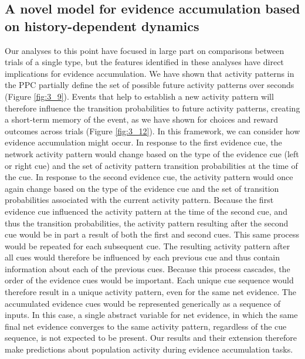 \subsection{A novel model for evidence accumulation based on history-dependent dynamics} \label{sec:chap3_ev_accum}

Our analyses to this point have focused in large part on comparisons between trials of a single type, but the features identified in these analyses have direct implications for evidence accumulation. We have shown that activity patterns in the PPC partially define the set of possible future activity patterns over seconds (Figure \ref{fig:3_9}). Events that help to establish a new activity pattern will therefore influence the transition probabilities to future activity patterns, creating a short-term memory of the event, as we have shown for choices and reward outcomes across trials (Figure \ref{fig:3_12}). In this framework, we can consider how evidence accumulation might occur. In response to the first evidence cue, the network activity pattern would change based on the type of the evidence cue (left or right cue) and the set of activity pattern transition probabilities at the time of the cue. In response to the second evidence cue, the activity pattern would once again change based on the type of the evidence cue and the set of transition probabilities associated with the current activity pattern. Because the first evidence cue influenced the activity pattern at the time of the second cue, and thus the transition probabilities, the activity pattern resulting after the second cue would be in part a result of both the first and second cues. This same process would be repeated for each subsequent cue. The resulting activity pattern after all cues would therefore be influenced by each previous cue and thus contain information about each of the previous cues. Because this process cascades, the order of the evidence cues would be important. Each unique cue sequence would therefore result in a unique activity pattern, even for the same net evidence. The accumulated evidence cues would be represented generically as a sequence of inputs. In this case, a single abstract variable for net evidence, in which the same final net evidence converges to the same activity pattern, regardless of the cue sequence, is not expected to be present. Our results and their extension therefore make predictions about population activity during evidence accumulation tasks.

